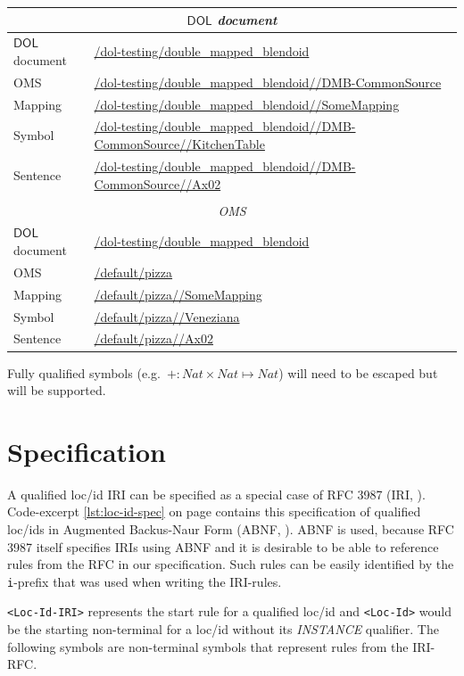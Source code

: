 \documentclass[10pt,fleqn,final]{scrreprt}
\newcommand*{\DOL}{\ensuremath{\mathsf{DOL}}\xspace}
\begin{document}
\begin{tabularx}{\textwidth}{p{}p{}}
  \multicolumn{2}{c}{\emph{\DOL document}} \\
  \hline
  \DOL document & \url{/dol-testing/double_mapped_blendoid}\\
  OMS & \url{/dol-testing/double_mapped_blendoid//DMB-CommonSource}\\
  Mapping & \url{/dol-testing/double_mapped_blendoid//SomeMapping}\\
  Symbol & \url{/dol-testing/double_mapped_blendoid//DMB-CommonSource//KitchenTable}\\
  Sentence & \url{/dol-testing/double_mapped_blendoid//DMB-CommonSource//Ax02}\\
  & \\
  \multicolumn{2}{c}{\emph{OMS}} \\
  \hline
  \DOL document & \url{/dol-testing/double_mapped_blendoid}\\
  OMS & \url{/default/pizza}\\
  Mapping & \url{/default/pizza//SomeMapping}\\
  Symbol & \url{/default/pizza//Veneziana}\\
  Sentence & \url{/default/pizza//Ax02}\\
\end{tabularx}

Fully qualified symbols (e.g.\ $+:Nat \times Nat\mapsto Nat$) will need to be escaped
but will be supported.

\section{Specification}

 A qualified loc/id IRI can be specified as a special case of RFC 3987 (IRI,
\cite{rfc3987}). Code-excerpt \ref{lst:loc-id-spec} on page
\pageref{lst:loc-id-spec} contains this specification of qualified loc/ids in
Augmented Backus-Naur Form (ABNF, \cite{rfc5234}). ABNF is used, because
RFC 3987 itself specifies IRIs using ABNF and it is desirable to be able to reference
rules from the RFC in our specification. Such rules can be easily identified by
the \texttt{i}-prefix that was used when writing the IRI-rules.

\texttt{<Loc-Id-IRI>} represents the start rule for a qualified loc/id and
\texttt{<Loc-Id>} would be the starting non-terminal for a loc/id without its
\emph{INSTANCE} qualifier. The following symbols are non-terminal symbols that
represent rules from the IRI-RFC.
\end{document}
